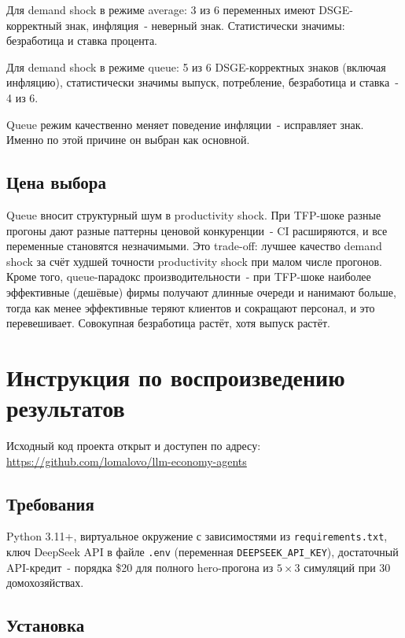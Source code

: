 \documentclass[12pt, a4paper]{article}
\begin{document}
Для demand shock в режиме average: 3 из 6 переменных имеют DSGE-корректный знак, инфляция~- неверный знак. Статистически значимы: безработица и ставка процента.

Для demand shock в режиме queue: 5 из 6 DSGE-корректных знаков (включая инфляцию), статистически значимы выпуск, потребление, безработица и ставка~- 4 из 6.

Queue режим качественно меняет поведение инфляции~- исправляет знак. Именно по этой причине он выбран как основной.

\subsection{Цена выбора}

Queue вносит структурный шум в productivity shock. При TFP-шоке разные прогоны дают разные паттерны ценовой конкуренции~- CI расширяются, и все переменные становятся незначимыми. Это trade-off: лучшее качество demand shock за счёт худшей точности productivity shock при малом числе прогонов. Кроме того, queue-парадокс производительности~- при TFP-шоке наиболее эффективные (дешёвые) фирмы получают длинные очереди и нанимают больше, тогда как менее эффективные теряют клиентов и сокращают персонал, и это перевешивает. Совокупная безработица растёт, хотя выпуск растёт.

\section{Инструкция по воспроизведению результатов}

Исходный код проекта открыт и доступен по адресу:\\
\url{https://github.com/lomalovo/llm-economy-agents}

\subsection{Требования}

Python 3.11+, виртуальное окружение с зависимостями из \texttt{requirements.txt}, ключ DeepSeek API в файле \texttt{.env} (переменная \texttt{DEEPSEEK\_API\_KEY}), достаточный API-кредит~- порядка \$20 для полного hero-прогона из $5 \times 3$ симуляций при 30 домохозяйствах.

\subsection{Установка}
\end{document}
